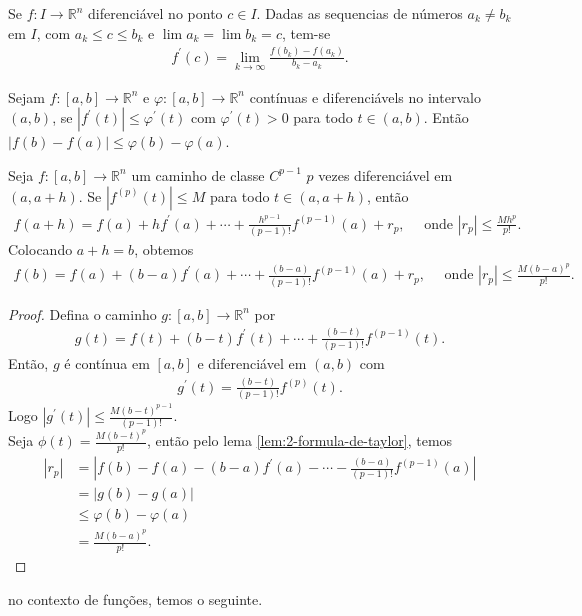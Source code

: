 \begin{lemma}
  Se $f:I\to\mathbb{R}^{n}$ diferenciável no ponto $c\in I$. Dadas as sequencias de números $a_k\neq b_k$ em $I$, com $a_k\leq c \leq b_k$ e $\lim a_k=\lim b_k=c$, tem-se
  \begin{align*}
    f^{\prime}(c)=\lim_{k \to \infty}\frac{f(b_k)-f(a_k)}{b_k-a_k}.
  \end{align*}
\end{lemma}
\begin{lemma}\label{lem:2-formula-de-taylor}
  Sejam $f:[a,b]\to\mathbb{R}^{n}$ e $\varphi:[a,b]\to\mathbb{R}^{n}$ contínuas e diferenciávels no intervalo $(a,b)$, se $|f^{\prime}(t)|\leq \varphi^{\prime}(t)$ com $\varphi^{\prime}(t)>0$ para todo $t\in(a,b)$. Então $|f(b)-f(a)|\leq \varphi(b)-\varphi(a)$. 
\end{lemma}
\begin{theorem}
  Seja $f:[a,b]\to\mathbb{R}^{n}$ um caminho de classe $C^{p-1}$ $p$ vezes diferenciável em $(a,a+h)$. Se $|f^{(p)}(t)|\leq M$ para todo $t\in(a,a+h)$, então
  \begin{align*}
    f(a+h)=f(a)+hf^{\prime}(a)+\cdots+\frac{h^{p-1}}{(p-1)!}f^{(p-1)}(a)+r_p,\quad\text{ onde }|r_p|\leq\frac{Mh^{p}}{p!}.
  \end{align*}
  Colocando $a+h=b$, obtemos
  \begin{align*}
    f(b)=f(a)+(b-a)f^{\prime}(a)+\cdots+\frac{(b-a)}{(p-1)!}f^{(p-1)}(a)+r_p,\quad\text{ onde }|r_p|\leq\frac{M(b-a)^{p}}{p!}.
  \end{align*}
\end{theorem}
\begin{proof} 
  Defina o caminho $g:[a,b]\to\mathbb{R}^{n}$ por
  \begin{align*}
    g(t)=f(t)+(b-t)f^{\prime}(t)+\cdots+\frac{(b-t)}{(p-1)!}f^{(p-1)}(t).
  \end{align*}
  Então, $g$ é contínua em $[a,b]$ e diferenciável em $(a,b)$ com
  \begin{align*}
    g^{\prime}(t)=\frac{(b-t)}{(p-1)!}f^{(p)}(t).
  \end{align*}
  Logo $|g^{\prime}(t)|\leq \frac{M(b-t)^{p-1}}{(p-1)!}$.\\
  Seja $\phi(t)=\frac{M(b-t)^{p}}{p!}$, então pelo lema \ref{lem:2-formula-de-taylor}, temos
  \begin{align*}
    |r_p|&=\left|f(b)-f(a)-(b-a)f^{\prime}(a)-\cdots-\frac{(b-a)}{(p-1)!}f^{(p-1)}(a)\right|\\
    &=|g(b)-g(a)|\\
    &\leq \varphi(b)-\varphi(a)\\
    &=\frac{M(b-a)^{p}}{p!}.
  \end{align*}
\end{proof}
no contexto de funções, temos o seguinte.

